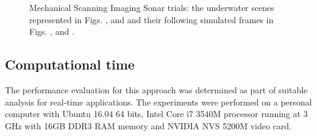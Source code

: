 \documentclass[final,5p,times]{elsarticle}
\begin{document}
\begin{figure}[!h]
{        \label{fig:msis_sim2}
    }
    \captionsetup{justification=centering}
    \caption{Mechanical Scanning Imaging Sonar trials: the underwater scenes represented in Figs. ,  and  and their following simulated frames in Figs. ,  and .}
    \label{fig:msis}
\end{figure}


\subsection{Computational time}

The performance evaluation for this approach was determined as part of suitable analysis for real-time applications. The experiments were performed on a personal computer with Ubuntu 16.04 64 bits, Intel Core i7 3540M processor running at 3 GHz with 16GB DDR3 RAM memory and NVIDIA NVS 5200M video card.
\end{document}
